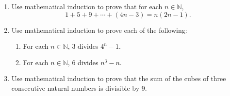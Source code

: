 \documentclass[letterpaper,12pt]{article}
\newcommand{\N}{\mathbb{N}}
\begin{document}
\begin{enumerate}
\item Use mathematical induction to prove that for each $n\in\N$,
\[
 1+5+9+\cdots+(4n-3)=n(2n-1).
\]
\item Use mathematical induction to prove each of the following:
\begin{enumerate}
 \item For each $n\in\N$, 3 divides $4^n-1$.
 \item For each $n\in\N$, 6 divides $n^3-n$.
\end{enumerate}
\item Use mathematical induction to prove that the sum of the cubes of three consecutive natural numbers is divisible by 9.

\end{enumerate}
\end{document}
